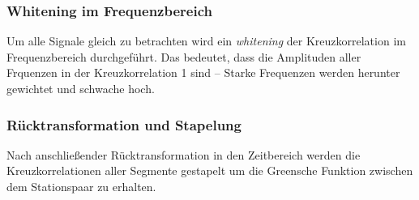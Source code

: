 \subsubsection*{Whitening im Frequenzbereich}
Um alle Signale gleich zu betrachten wird ein \textit{whitening} der Kreuzkorrelation im Frequenzbereich durchgeführt. Das bedeutet, dass die Amplituden aller Frquenzen in der Kreuzkorrelation 1 sind -- Starke Frequenzen werden herunter gewichtet und schwache hoch.

\subsubsection*{Rücktransformation und Stapelung}
Nach anschließender Rücktransformation in den Zeitbereich werden die Kreuzkorrelationen aller Segmente gestapelt um die Greensche Funktion zwischen dem Stationspaar zu erhalten.